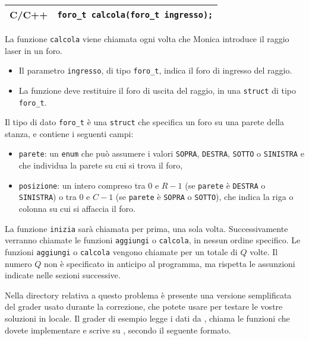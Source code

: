 \medskip

\begin{center}\begin{tabularx}{\textwidth}{|c|X|}
\hline
C/C++  & \verb|foro_t calcola(foro_t ingresso);|\\
\hline
\end{tabularx}\end{center}

La funzione \texttt{calcola} viene chiamata ogni volta che Monica introduce il raggio laser in un foro.
\begin{itemize}[nolistsep]
	\item Il parametro \texttt{ingresso}, di tipo \texttt{foro\_t}, indica il foro di ingresso del raggio.
	\item La funzione deve restituire il foro di uscita del raggio, in una \texttt{struct} di tipo \texttt{foro\_t}.
\end{itemize}
Il tipo di dato \texttt{foro\_t} è una \texttt{struct} che specifica un foro su una parete della stanza,
e contiene i seguenti campi:
\begin{itemize}
	\item \texttt{parete}:
      un \texttt{enum} che può assumere i valori \texttt{SOPRA}, \texttt{DESTRA}, \texttt{SOTTO} o \texttt{SINISTRA}
      e che individua la parete su cui si trova il foro,
	\item \texttt{posizione}:
	    un intero compreso tra $0$ e $R-1$ (se \texttt{parete} è \texttt{DESTRA} o \texttt{SINISTRA})
	    o tra $0$ e $C-1$ (se \texttt{parete} è \texttt{SOPRA} o \texttt{SOTTO}),
	    che indica la riga o colonna su cui si affaccia il foro.
\end{itemize}

\medskip

La funzione \texttt{inizia} sarà chiamata per prima, una sola volta.
Successivamente verranno chiamate le funzioni \texttt{aggiungi} o \texttt{calcola},
in nessun ordine specifico.
Le funzioni \texttt{aggiungi} o \texttt{calcola} vengono chiamate per un totale di $Q$ volte.
Il numero $Q$ non è specificato in anticipo al programma,
ma rispetta le assunzioni indicate nelle sezioni successive.



\Grader
Nella directory relativa a questo problema è presente una versione semplificata del grader usato durante la correzione, che potete usare per testare le vostre soluzioni in locale. Il grader di esempio legge i dati da , chiama le funzioni che dovete implementare e scrive su \outputfile{}, secondo il seguente formato.


